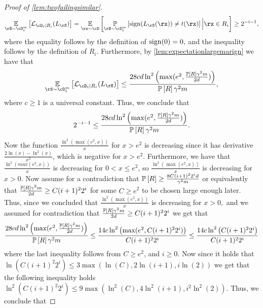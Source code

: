 \begin{proof}[Proof of \cref{lem:twofailingsimilar}]
\begin{align*}
        \e_{\rS\sim \cD_{t}^{m}}\left[\ls_{\cD_{t}|R_{i}}(L_{\rS})\right]=\e_{\rx\sim \cD}\left[\p_{\rS\sim \cD_{t}^{m}}\left[\sign(L_{\rS}(\rx))\not=t(\rx)\right]\Big|\rx\in R_{i} \right]\geq 2^{-i-1},
    \end{align*}    
    where the equality follows by the definition of $ \operatorname{\mathrm{sign}}(0)=0,$ and the inequality follows by the definition of $ R_{i}$.  Furthermore, by \cref{lem:expectationlargemarign} we have that 
    \begin{align*}
        \e_{\rS\sim \cD_{t}^{m}}\left[\ls_{\cD_{t}|R_{i}}(L_{\rS})\right]\leq  \frac{28 cd\ln^{2}{\left( \max(e^{2},\frac{\p\left[R\right]\gamma^{2}m}{2d})\right)}}{\p\left[R\right]\gamma^{2}m},
    \end{align*}
    where $ c \geq 1$ is a universal constant.  
    Thus, we conclude that 
    \begin{align}\label{eq:twofailingsimilar1}
        2^{-i-1}\leq \frac{28 cd\ln^{2}{\left( \max(e^{2},\frac{\operatorname*{\mathbb{P}}\left[R\right]\gamma^{2}m}{2d})\right)}}{\operatorname*{\mathbb{P}}\left[R\right]\gamma^{2}m}.
    \end{align}
    Now the function $ \frac{\ln^{2}{\left(\max(e^{2},x) \right)}}{x} $ for $ x>e^{2} $ is decreasing since it has derivative $\frac{2\ln{\left(x \right)}-\ln^{2}{\left(x \right)}}{x^{2}}  $, which is negative for $ x>e^{2} $. Furthermore, we have that $ \frac{\ln^{2}(max(e^{2},x))}{x} $ is decreasing for $ 0<x\leq e^{2} $, so   $ \frac{\ln^{2}{\left(\max(e^{2},x) \right)}}{x} $  is decreasing   for $ x>0.$ Now assume for a contradiction that $ \operatorname*{\mathbb{P}}\left[R\right]\geq \frac{8C(i+1)^{2}2^{i}d}{\gamma^{2}m} $ or equivalently that $ \frac{\operatorname*{\mathbb{P}}\left[R\right]\gamma^{2}m}{2d}\geq C(i+1)^{2}2^{i}$ for some $ C\geq e^{2} $  to be chosen large enough later.  Thus, since we concluded that $ \frac{\ln^{2}{\left(\max(e^{2},x) \right)}}{x} $  is decreasing   for $ x>0,$ and we assumed for contradiction that $ \frac{\operatorname*{\mathbb{P}}\left[R\right]\gamma^{2}m}{2d}\geq C(i+1)^{2}2^{i}$ we get that 
    \begin{align*}
        \frac{28 cd\ln^{2}{\left( \max(e^{2},\frac{\operatorname*{\mathbb{P}}\left[R\right]\gamma^{2}m}{2d})\right)}}{\operatorname*{\mathbb{P}}\left[R\right]\gamma^{2}m}
        \leq
        \frac{14 c\ln^{2}{\left( \max(e^{2},C(i+1)^{2}2^{i})\right)}}{ C(i+1)^{2}2^{i}}
        \leq \frac{14 c\ln^{2}{\left( C(i+1)^{2}2^{i}\right)}}{ C(i+1)^{2}2^{i}}
    \end{align*}
    where the last inequality follows from $ C\geq e^{2} $, and $ i\geq0.$ Now since it holds that $ \ln{\left(C(i+1)^{2}2^{i} \right)}\leq 3 \max(\ln{\left(C \right)},2\ln{\left(i+1 \right)},i\ln{\left(2 \right)}) $ we get that the following inequality holds   $ \ln^{2}{\left( C(i+1)^{2}2^{i}\right)}\leq 9 \max(\ln^{2}{\left(C \right)},4\ln^{2}{\left(i+1 \right)},i^{2}\ln^{2}{\left(2 \right)}) $. Thus, we conclude that 

\end{proof}
